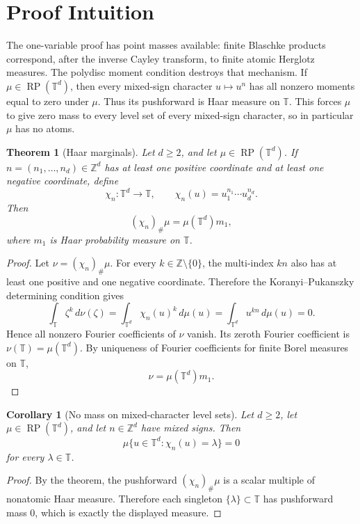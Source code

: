 \documentclass[11pt]{article}
\newtheorem{theorem}{Theorem}
\newtheorem{corollary}{Corollary}
\newcommand{\T}{\mathbb T}
\newcommand{\Z}{\mathbb Z}
\newcommand{\RP}{\operatorname{RP}}
\begin{document}
\section*{Proof Intuition}

The one-variable proof has point masses available: finite Blaschke
products correspond, after the inverse Cayley transform, to finite atomic
Herglotz measures.  The polydisc moment condition destroys that mechanism.
If \(\mu\in\RP(\T^d)\), then every mixed-sign character
\(u\mapsto u^n\) has all nonzero moments equal to zero under \(\mu\).
Thus its pushforward is Haar measure on \(\T\).  This forces \(\mu\) to
give zero mass to every level set of every mixed-sign character, so in
particular \(\mu\) has no atoms.

\begin{theorem}[Haar marginals]
Let \(d\geq 2\), and let \(\mu\in\RP(\T^d)\).  If
\(n=(n_1,\ldots,n_d)\in\Z^d\) has at least one positive coordinate and
at least one negative coordinate, define
\[
  \chi_n:\T^d\to\T,\qquad \chi_n(u)=u_1^{n_1}\cdots u_d^{n_d}.
\]
Then
\[
  (\chi_n)_\#\mu=\mu(\T^d)m_1,
\]
where \(m_1\) is Haar probability measure on \(\T\).
\end{theorem}

\begin{proof}
Let \(\nu=(\chi_n)_\#\mu\).  For every \(k\in\Z\setminus\{0\}\),
the multi-index \(kn\) also has at least one positive and one negative
coordinate.  Therefore the Koranyi--Pukanszky determining condition gives
\[
  \int_\T \zeta^k\,d\nu(\zeta)
  =\int_{\T^d} \chi_n(u)^k\,d\mu(u)
  =\int_{\T^d} u^{kn}\,d\mu(u)=0 .
\]
Hence all nonzero Fourier coefficients of \(\nu\) vanish.  Its zeroth
Fourier coefficient is \(\nu(\T)=\mu(\T^d)\).  By uniqueness of Fourier
coefficients for finite Borel measures on \(\T\),
\[
  \nu=\mu(\T^d)m_1 .
\]
\end{proof}

\begin{corollary}[No mass on mixed-character level sets]
Let \(d\geq2\), let \(\mu\in\RP(\T^d)\), and let \(n\in\Z^d\) have mixed
signs.  Then
\[
  \mu\{u\in\T^d:\chi_n(u)=\lambda\}=0
\]
for every \(\lambda\in\T\).
\end{corollary}

\begin{proof}
By the theorem, the pushforward \((\chi_n)_\#\mu\) is a scalar multiple of
nonatomic Haar measure.  Therefore each singleton \(\{\lambda\}\subset\T\)
has pushforward mass \(0\), which is exactly the displayed measure.
\end{proof}
\end{document}
